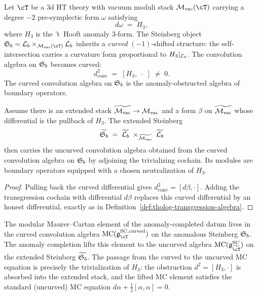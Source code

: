 \begin{construction}
\label{constr:anomalous-steinberg}
Let $\cT$ be a 3d HT theory with vacuum moduli stack
$\Mvac(\cT)$ carrying a degree \(-2\) pre-symplectic form
$\omega$ satisfying
\[
d\omega \;=\; H_3,
\]
where $H_3$ is the 't~Hooft anomaly $3$-form.  The Steinberg
object $\Sb = \Lb \times_{\Mvac(\cT)} \Lb$ inherits a
\emph{curved} $(-1)$-shifted structure: the self-intersection
carries a curvature form proportional to $H_3|_{\mathcal{L}_b}$. The
convolution algebra on $\mathfrak{S}_b$ becomes curved:
\[
d^2_{\mathrm{conv}} \;=\; [H_3,\;\cdot\;] \;\neq\; 0.
\]
The curved convolution algebra on $\mathfrak{S}_b$ is the
anomaly-obstructed algebra of boundary operators.
\end{construction}

\begin{proposition}
\label{prop:anomaly-completion-trivialization}
Assume there is an extended stack
\(\widetilde{\mathcal{M}_{\mathrm{vac}}}\to\mathcal{M}_{\mathrm{vac}}\) and a form \(\beta\) on
\(\widetilde{\mathcal{M}_{\mathrm{vac}}}\) whose differential is the pullback of
\(H_3\).  The extended Steinberg
\[
\widetilde{\mathfrak{S}_b}
\;=\;
\widetilde{\mathcal{L}_b}
\;\times_{\widetilde{\mathcal{M}_{\mathrm{vac}}}}\;
\widetilde{\mathcal{L}_b}
\]
then carries the uncurved convolution algebra obtained from the
curved convolution algebra on \(\mathfrak{S}_b\) by adjoining the trivializing
cochain.  Its modules are boundary operators equipped with a chosen
neutralization of \(H_3\).
\end{proposition}

\begin{proof}
Pulling back the curved differential gives
\(d_{\mathrm{conv}}^2=[d\beta,\cdot]\).  Adding the transgression
cochain with differential \(d\beta\) replaces this curved
differential by an honest differential, exactly as in
Definition~\ref{def:tholog-transgression-algebra}.
\end{proof}

\begin{remark}
\label{rem:modular-mc-curved-steinberg}
The modular Maurer--Cartan element of the anomaly-completed datum
lives in the curved convolution algebra
$\mathrm{MC}(\mathfrak{g}^{\mathrm{SC},\mathrm{curved}}_\cT)$
on the anomalous Steinberg $\mathfrak{S}_b$. The anomaly completion
lifts this element to the uncurved algebra
$\mathrm{MC}(\mathfrak{g}^{\mathrm{SC}}_{\widetilde\cT})$
on the extended Steinberg $\widetilde{\mathfrak{S}_b}$. The passage
from the curved to the uncurved MC equation is precisely the
trivialization of $H_3$: the obstruction $d^2 = [H_3, \cdot]$
is absorbed into the extended stack, and the lifted MC element
satisfies the standard (uncurved) MC equation
$d\alpha + \tfrac{1}{2}[\alpha,\alpha] = 0$.
\end{remark}

